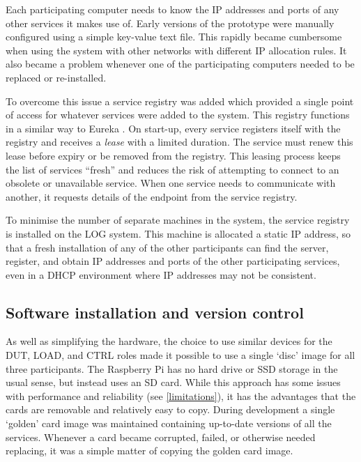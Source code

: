 Each participating computer needs to know the IP addresses and ports of any other services it makes use of. Early versions of the prototype were manually configured using a simple key-value text file. This rapidly became cumbersome when using the system with other networks with different IP allocation rules. It also became a problem whenever one of the participating computers needed to be replaced or re-installed.

To overcome this issue a service registry was added which provided a single point of access for whatever services were added to the system. This registry functions in a similar way to Eureka \citep{Netflix2012}. On start-up, every service registers itself with the registry and receives a \emph{lease} with a limited duration. The service must renew this lease before expiry or be removed from the registry. This leasing process keeps the list of services \enquote{fresh} \citep{Arnold1999} and reduces the risk of attempting to connect to an obsolete or unavailable service. When one service needs to communicate with another, it requests details of the endpoint from the service registry.

To minimise the number of separate machines in the system, the service registry is installed on the LOG system. This machine is allocated a static IP address, so that a fresh installation of any of the other participants can find the server, register, and obtain IP addresses and ports of the other participating services, even in a DHCP environment where IP addresses may not be consistent.

\subsection{Software installation and version control}

As well as simplifying the hardware, the choice to use similar devices for the DUT, LOAD, and CTRL roles made it possible to use a single `disc' image for all three participants. The Raspberry Pi has no hard drive or SSD storage in the usual sense, but instead uses an SD card. While this approach has some issues with performance and reliability (see \autoref{limitations}), it has the advantages that the cards are removable and relatively easy to copy. During development a single `golden' card image was maintained containing up-to-date versions of all the services. Whenever a card became corrupted, failed, or otherwise needed replacing, it was a simple matter of copying the golden card image.

